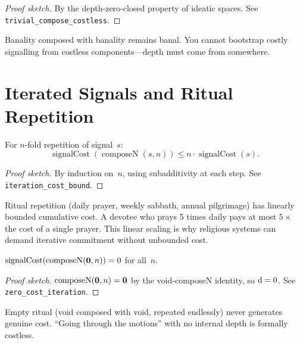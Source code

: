 \begin{proof}[Proof sketch]
By the depth-zero-closed property of ideatic spaces.
See \texttt{trivial\_compose\_costless}.
\end{proof}

\begin{remark}
Banality composed with banality remains banal.  You cannot bootstrap
costly signalling from costless components---depth must come from
somewhere.
\end{remark}

\section{Iterated Signals and Ritual Repetition}
\label{sec:ch3:iteration}

\begin{theorem}
\label{thm:iteration-cost}
For $n$-fold repetition of signal~$s$:
\[
  \operatorname{signalCost}(\operatorname{composeN}(s, n))
  \leq n \cdot \operatorname{signalCost}(s).
\]
\end{theorem}

\begin{proof}[Proof sketch]
By induction on~$n$, using subadditivity at each step.
See \texttt{iteration\_cost\_bound}.
\end{proof}

\begin{remark}
Ritual repetition (daily prayer, weekly sabbath, annual pilgrimage) has
linearly bounded cumulative cost.  A devotee who prays 5 times daily
pays at most $5 \times$ the cost of a single prayer.  This linear
scaling is why religious systems can demand iterative commitment without
unbounded cost.
\end{remark}

\begin{theorem}
\label{thm:zero-cost-iteration}
$\operatorname{signalCost}(\operatorname{composeN}(\mathbf{0}, n)) = 0$
for all~$n$.
\end{theorem}

\begin{proof}[Proof sketch]
$\operatorname{composeN}(\mathbf{0}, n) = \mathbf{0}$ by the void-composeN
identity, so $\operatorname{d} = 0$.  See \texttt{zero\_cost\_iteration}.
\end{proof}

\begin{remark}
Empty ritual (void composed with void, repeated endlessly) never
generates genuine cost.  ``Going through the motions'' with no internal
depth is formally costless.
\end{remark}

